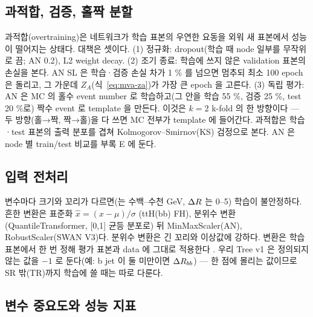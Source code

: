 \subsection{과적합, 검증, 홀짝 분할}\label{sec:mva-basics-overfit}

과적합(overtraining)은 네트워크가 학습 표본의 우연한 요동을 외워 새 표본에서 성능이 떨어지는 상태다. 대책은 셋이다.
(1) 정규화: dropout(학습 때 node 일부를 무작위로 끔; AN 0.2), L2 weight decay. (2) 조기 종료: 학습에 쓰지 않은 validation 표본의 손실을
본다. AN SL 은 학습·검증 손실 차가 1 \% 를 넘으면 멈추되 최소 100 epoch 은 돌리고, 그 가운데
$Z_A$(식~\eqref{eq:mva-za})가 가장 큰 epoch 을 고른다. (3) 독립 평가: AN 은 MC 의 홀수 event number 로 학습하고(그 안을 학습 55 \%, 검증 25 \%,
test 20 \%로) 짝수 event 로 template 을 만든다. 이것은 $k=2$ k-fold 의 한 방향이다 — 두 방향(홀→짝,
짝→홀)을 다 쓰면 MC 전부가 template 에 들어간다. 과적합은 학습·test 표본의 출력 분포를 겹쳐 Kolmogorov–Smirnov(KS) 검정으로 본다.
AN 은 node 별 train/test 비교를 부록 E 에 둔다.

\subsection{입력 전처리}\label{sec:mva-basics-prep}

변수마다 크기와 꼬리가 다르면(\HT 는 수백--수천 GeV, $\Delta R$ 는 0--5) 학습이 불안정하다. 흔한 변환은 표준화 $\hat x=(x-\mu)/\sigma$
(ttH(bb) FH), 분위수 변환(QuantileTransformer, [0,1] 균등 분포로) 뒤 MinMaxScaler(AN),
RobustScaler(SWAN V3)다. 분위수 변환은 긴 꼬리와 이상값에 강하다. 변환은 학습 표본에서 한 번 정해 평가 표본과 data 에 그대로 적용한다
. 우리 Tree v1 은 정의되지 않는 값을 $-1$ 로 둔다(예: b jet 이 둘 미만이면 $\Delta R_{bb}$) — 한 점에
몰리는 값이므로 SR 밖(TR)까지 학습에 쓸 때는 따로 다룬다.

\subsection{변수 중요도와 성능 지표}\label{sec:mva-basics-metrics}

